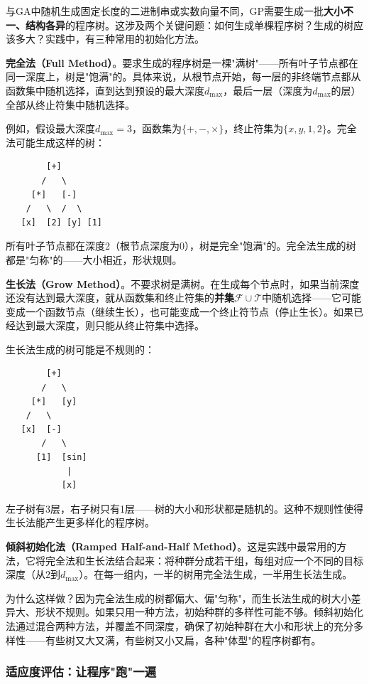 \documentclass[lang=cn,zihao=-4,a4paper,fontset=windows]{beautybook}
\begin{document}
与GA中随机生成固定长度的二进制串或实数向量不同，GP需要生成一批\textbf{大小不一、结构各异}的程序树。这涉及两个关键问题：如何生成单棵程序树？生成的树应该多大？实践中，有三种常用的初始化方法。

\textbf{完全法（Full Method）}。要求生成的程序树是一棵"满树"——所有叶子节点都在同一深度上，树是"饱满"的。具体来说，从根节点开始，每一层的非终端节点都从函数集中随机选择，直到达到预设的最大深度$d_{\max}$，最后一层（深度为$d_{\max}$的层）全部从终止符集中随机选择。

例如，假设最大深度$d_{\max} = 3$，函数集为$\{+, -, \times\}$，终止符集为$\{x, y, 1, 2\}$。完全法可能生成这样的树：

\begin{verbatim}
        [+]
       /   \
     [*]   [-]
    /   \  /  \
   [x]  [2] [y] [1]
\end{verbatim}

所有叶子节点都在深度2（根节点深度为0），树是完全"饱满"的。完全法生成的树都是"匀称"的——大小相近，形状规则。

\textbf{生长法（Grow Method）}。不要求树是满树。在生成每个节点时，如果当前深度还没有达到最大深度，就从函数集和终止符集的\textbf{并集}$\mathcal{F} \cup \mathcal{T}$中随机选择——它可能变成一个函数节点（继续生长），也可能变成一个终止符节点（停止生长）。如果已经达到最大深度，则只能从终止符集中选择。

生长法生成的树可能是不规则的：

\begin{verbatim}
        [+]
       /   \
     [*]   [y]
    /   \
   [x]  [-]
       /   \
      [1]  [sin]
            |
           [x]
\end{verbatim}

左子树有3层，右子树只有1层——树的大小和形状都是随机的。这种不规则性使得生长法能产生更多样化的程序树。

\textbf{倾斜初始化法（Ramped Half-and-Half Method）}。这是实践中最常用的方法，它将完全法和生长法结合起来：将种群分成若干组，每组对应一个不同的目标深度（从$2$到$d_{\max}$）。在每一组内，一半的树用完全法生成，一半用生长法生成。

为什么这样做？因为完全法生成的树都偏大、偏"匀称"，而生长法生成的树大小差异大、形状不规则。如果只用一种方法，初始种群的多样性可能不够。倾斜初始化法通过混合两种方法，并覆盖不同深度，确保了初始种群在大小和形状上的充分多样性——有些树又大又满，有些树又小又扁，各种"体型"的程序树都有。

\subsubsection{适应度评估：让程序"跑"一遍}
\end{document}
